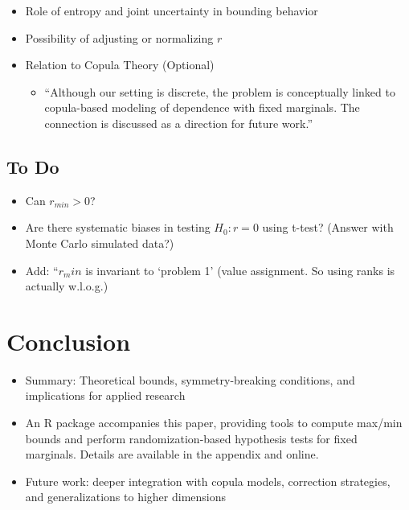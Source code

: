 \documentclass[
  12pt,
]{article}
\providecommand{\tightlist}{%
  \setlength{\itemsep}{0pt}\setlength{\parskip}{0pt}}\usepackage{longtable,booktabs,array}
\theoremstyle{plain}
\theoremstyle{definition}
\theoremstyle{remark}
\begin{document}
\begin{itemize}
\tightlist
\item
  Role of entropy and joint uncertainty in bounding behavior\\
\item
  Possibility of adjusting or normalizing \(r\)
\item
  Relation to Copula Theory (Optional)

  \begin{itemize}
  \tightlist
  \item
    ``Although our setting is discrete, the problem is conceptually
    linked to copula-based modeling of dependence with fixed marginals.
    The connection is discussed as a direction for future work.''
  \end{itemize}
\end{itemize}

\subsection{To Do}\label{to-do}

\begin{itemize}
\tightlist
\item
  Can \(r_{min} >0\)?
\item
  Are there systematic biases in testing \(H_0: r=0\) using t-test?
  (Answer with Monte Carlo simulated data?)
\item
  Add: ``\(r_min\) is invariant to `problem 1' (value assignment. So
  using ranks is actually w.l.o.g.)
\end{itemize}

\section{Conclusion}\label{conclusion}

\begin{itemize}
\tightlist
\item
  Summary: Theoretical bounds, symmetry-breaking conditions, and
  implications for applied research
\item
  An R package accompanies this paper, providing tools to compute
  max/min bounds and perform randomization-based hypothesis tests for
  fixed marginals. Details are available in the appendix and online.
\item
  Future work: deeper integration with copula models, correction
  strategies, and generalizations to higher dimensions
\end{itemize}
\end{document}
